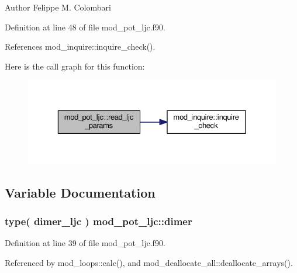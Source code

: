 \begin{DoxyAuthor}{Author}
Felippe M. Colombari 
\end{DoxyAuthor}


Definition at line 48 of file mod\+\_\+pot\+\_\+ljc.\+f90.



References mod\+\_\+inquire\+::inquire\+\_\+check().



Here is the call graph for this function\+:\nopagebreak
\begin{figure}[H]
\begin{center}
\leavevmode
\includegraphics[width=329pt]{namespacemod__pot__ljc_aba75dd17c928cdddf564bf03d18b3ee2_cgraph}
\end{center}
\end{figure}




\subsection{Variable Documentation}
\subsubsection[{\texorpdfstring{dimer}{dimer}}]{\setlength{\rightskip}{0pt plus 5cm}type( {\bf dimer\+\_\+ljc} ) mod\+\_\+pot\+\_\+ljc\+::dimer}\hypertarget{namespacemod__pot__ljc_abbcaeaac6c53085e893805852918464d}{}\label{namespacemod__pot__ljc_abbcaeaac6c53085e893805852918464d}


Definition at line 39 of file mod\+\_\+pot\+\_\+ljc.\+f90.



Referenced by mod\+\_\+loops\+::calc(), and mod\+\_\+deallocate\+\_\+all\+::deallocate\+\_\+arrays().

